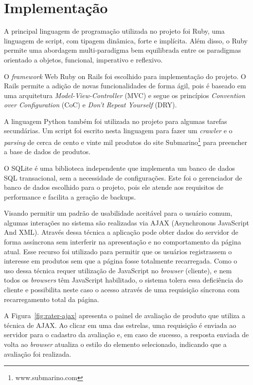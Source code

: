 \section{Implementação} %
\label{sec:implementacao}

A principal linguagem de programação utilizada no projeto foi Ruby, uma linguagem de script, com tipagem dinâmica, forte e implícita. Além disso, o Ruby permite uma abordagem multi-paradigma bem equilibrada entre os paradigmas orientado a objetos, funcional, imperativo e reflexivo. 

O \emph{framework} Web Ruby on Rails foi escolhido para implementação do projeto. O Rails permite a adição de novas funcionalidades de forma ágil, pois é baseado em uma arquitetura \emph{Model-View-Controller} \cite{burbeck1992applications} (MVC) e segue os princípios \emph{Convention over Configuration} \cite{ruby2009agile} (CoC) e \emph{Don't Repeat Yourself} \cite{hunt-don} (DRY).

A linguagem Python também foi utilizada no projeto para algumas tarefas secundárias. Um script foi escrito nesta linguagem para fazer um \emph{crawler} e o \emph{parsing} de cerca de cento e vinte mil produtos do site Submarino\footnote{www.submarino.com} para preencher a base de dados de produtos.

O SQLite é uma biblioteca independente que implementa um banco de dados SQL transacional, sem a necessidade de configurações. Este foi o gerenciador de banco de dados escolhido para o projeto, pois ele atende aos requisitos de performance e facilita a geração de backups.

Visando permitir um padrão de usabilidade aceitável para o usuário comum, algumas interações no sistema são realizadas via AJAX (Asynchronous JavaScript And XML). Através dessa técnica a aplicação pode obter dados do servidor de forma assíncrona sem interferir na apresentação e no comportamento da página atual. Esse recurso foi utilizado para permitir que os usuários registrassem o interesse em produtos sem que a página fosse totalmente recarregada. Como o uso dessa técnica requer utilização de JavaScript no \emph{browser} (cliente), e nem todos os \emph{browsers} têm JavaScript habilitado, o sistema tolera essa deficiência do cliente e possibilita neste caso o acesso através de uma requisição síncrona com recarregamento total da página.

A Figura~\ref{fig:rater-ajax} apresenta o painel de avaliação de produto que utiliza a técnica de AJAX. Ao clicar em uma das estrelas, uma requisição é enviada ao servidor para o cadastro da avaliação e, em caso de sucesso, a resposta enviada de volta ao \emph{browser} atualiza o estilo do elemento selecionado, indicando que a avaliação foi realizada.


